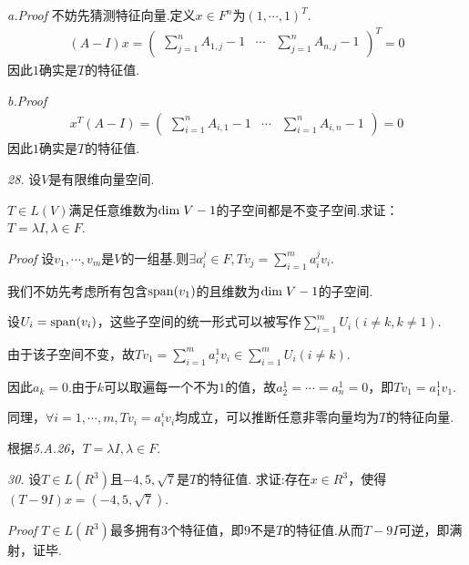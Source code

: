 \textit{a.Proof}
不妨先猜测特征向量.定义\(x \in F^n\)为\((1,\cdots,1)^T\).
    \begin{align*}
        (A-I)x=
            \begin{pmatrix}
                \sum_{j=1}^n A_{1,j}-1 & \cdots & \sum_{j=1}^n A_{n,j}-1
            \end{pmatrix}^T
            =0
    \end{align*}
因此\(1\)确实是\(T\)的特征值.

\textit{b.Proof}
    \begin{align*}
        x^T(A-I)=
            \begin{pmatrix}
                \sum_{i=1}^n A_{i,1}-1 & \cdots & \sum_{i=1}^n A_{i,n}-1
            \end{pmatrix}
                =0
    \end{align*}
因此\(1\)确实是\(T\)的特征值.

\hspace*{\fill}

\textit{28.}
设\(V\)是有限维向量空间.

\(T \in L(V)\)满足任意维数为\(\mathrm{dim \;} V-1\)的子空间都是不变子空间.求证：\(T=\lambda I,\lambda \in F\).

\textit{Proof}
设\(v_1,\cdots,v_m\)是\(V\)的一组基.则\(\exists a_i^j \in F,Tv_j=\sum_{i=1}^m a_i^j v_i\).

我们不妨先考虑所有包含\(\mathrm{span} (v_1)\)的且维数为\(\mathrm{dim \;} V-1\)的子空间.

设\(U_i=\mathrm{span} (v_i)\)，这些子空间的统一形式可以被写作\(\sum_{i=1}^m U_i(i \ne k,k \ne 1)\).

由于该子空间不变，故\(Tv_1=\sum_{i=1}^m a_i^1 v_i \in \sum_{i=1}^m U_i(i \ne k)\).

因此\(a_{k}=0\).由于\(k\)可以取遍每一个不为\(1\)的值，故\(a_2^1=\cdots=a_n^1=0\)，即\(Tv_1=a_1^1 v_1\).

同理，\(\forall i=1,\cdots,m,Tv_i=a_i^i v_i\)均成立，可以推断任意非零向量均为\(T\)的特征向量.

根据\textit{5.A.26}，\(T=\lambda I,\lambda \in F\).

\hspace*{\fill}

\textit{30.}
设\(T \in L(R^3)\)且\(-4,5,\sqrt{7}\)是\(T\)的特征值.
求证:存在\(x \in R^3\)，使得\((T-9I)x=(-4,5,\sqrt{7})\).

\textit{Proof}
\(T \in L(R^3)\)最多拥有\(3\)个特征值，即\(9\)不是\(T\)的特征值.从而\(T-9I\)可逆，即满射，证毕.

\newpage

